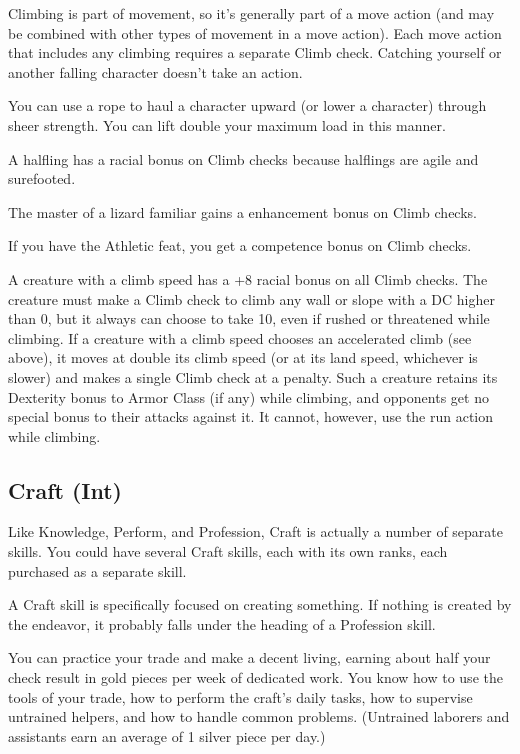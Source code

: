  Climbing is part of movement, so it's generally part of a move action (and may be combined with other types of movement in a move action). Each move action that includes any climbing requires a separate Climb check. Catching yourself or another falling character doesn't take an action.

 You can use a rope to haul a character upward (or lower a character) through sheer strength. You can lift double your maximum load in this manner.

\par A halfling has a  racial bonus on Climb checks because halflings are agile and surefooted.

\par The master of a lizard familiar gains a  enhancement bonus on Climb checks.

\par If you have the Athletic feat, you get a  competence bonus on Climb checks.

\par A creature with a climb speed has a +8 racial bonus on all Climb checks. The creature must make a Climb check to climb any wall or slope with a DC higher than 0, but it always can choose to take 10, even if rushed or threatened while climbing. If a creature with a climb speed chooses an accelerated climb (see above), it moves at double its climb speed (or at its land speed, whichever is slower) and makes a single Climb check at a  penalty. Such a creature retains its Dexterity bonus to Armor Class (if any) while climbing, and opponents get no special bonus to their attacks against it. It cannot, however, use the run action while climbing.

\subsection{Craft (Int)}
Like Knowledge, Perform, and Profession, Craft is actually a number of separate skills. You could have several Craft skills, each with its own ranks, each purchased as a separate skill.

A Craft skill is specifically focused on creating something. If nothing is created by the endeavor, it probably falls under the heading of a Profession skill.

 You can practice your trade and make a decent living, earning about half your check result in gold pieces per week of dedicated work. You know how to use the tools of your trade, how to perform the craft's daily tasks, how to supervise untrained helpers, and how to handle common problems. (Untrained laborers and assistants earn an average of 1 silver piece per day.)

